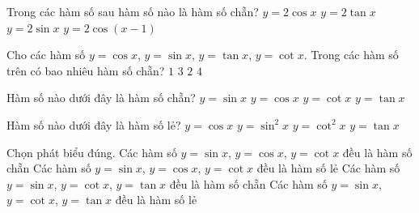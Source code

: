 \begin{ex}%
	Trong các hàm số sau  hàm số nào là hàm số chẵn?
	\choice 
		 {\True $y=2\cos x$}
		{$y=2\tan  x$}
		{$y=2\sin x$} 
		{$y=2\cos \left(x-1\right)$} 
\end{ex}

\begin{ex}%
	Cho các hàm số $y = \cos x$, $y = \sin x$, $y =  \tan x$, $y = \cot x$. Trong các hàm số trên có bao nhiêu hàm số chẵn?
	\choice 
		{\True  $1$}
		 {$3$}
		 {$2$}
		{$4$} 
\end{ex}

\begin{ex}%
	Hàm số nào dưới đây là hàm số  chẵn?
	\choice 
		{$y = \sin x$} 
		{\True $y = \cos x$} 
		{$y = \cot x$} 
		 {$y = \tan x$}
\end{ex}

\begin{ex}%
	Hàm số nào dưới đây là  hàm số lẻ?
	\choice 
		{$y=\cos x$} 
		 {$y=\sin^2 x$}
		{$y=\cot^2  x$}
		{\True $y=\tan x$} 
\end{ex}

\begin{ex}%
	Chọn phát biểu  đúng.
	 \choice
		{Các hàm số $y=\sin x$, $y=\cos x$, $y=\cot x$ đều là hàm số  chẵn}
		{Các  hàm số $y=\sin x$, $y=\cos x$, $y=\cot x$ đều là hàm số lẻ}
		{Các hàm số $y=\sin x$, $y=\cot x$, $y=\tan x$ đều là hàm số chẵn} 
		{\True Các hàm số $y=\sin x$, $y=\cot x$, $y=\tan x$ đều là hàm  số lẻ}
\end{ex}

